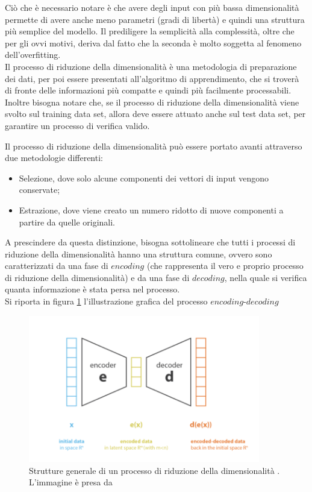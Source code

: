 Ciò che è necessario notare è che avere degli input con più bassa dimensionalità permette di avere anche meno parametri (gradi di libertà) e quindi una struttura più semplice del modello. Il prediligere la semplicità alla complessità, oltre che per gli ovvi motivi, deriva dal fatto che la seconda è molto soggetta al fenomeno dell'overfitting. \\
Il processo di riduzione della dimensionalità è una metodologia di preparazione dei dati, per poi essere presentati all'algoritmo di apprendimento, che si troverà di fronte delle informazioni più compatte e quindi più facilmente processabili. \\
Inoltre bisogna notare che, se il processo di riduzione della dimensionalità viene svolto sul training data set, allora deve essere attuato anche sul test data set, per garantire un processo di verifica valido.
\newpage

Il processo di riduzione della dimensionalità può essere portato avanti attraverso due metodologie differenti:
\begin{itemize}
	\item Selezione, dove solo alcune componenti dei vettori di input vengono conservate;
	\item Estrazione, dove viene creato un numero ridotto di nuove componenti a partire da quelle originali.
\end{itemize}
A prescindere da questa distinzione, bisogna sottolineare che tutti i processi di riduzione della dimensionalità hanno una struttura comune, ovvero sono caratterizzati da una fase di $\textit{encoding}$ (che rappresenta il vero e proprio processo di riduzione della dimensionalità) e da una fase di $\textit{decoding}$, nella quale si verifica quanta informazione è stata persa nel processo. \\ 
Si riporta in figura \ref{encoder-decoder} l'illustrazione grafica del processo $\textit{encoding-decoding}$
\begin{figure}[h!]
	\centering
	\includegraphics[width=0.90\textwidth]{figs/encoder-decoder.png}
	\caption{Strutture generale di un processo di riduzione della dimensionalità . L'immagine è presa da \cite{Understanding_VAEs}}
	\label{encoder-decoder}
\end{figure}

